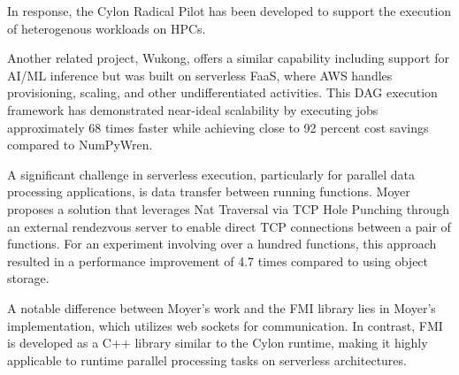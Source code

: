 In response, the Cylon Radical Pilot has been developed to support the execution of heterogenous workloads on HPCs. \cite{sarker2024radical}

Another related project, Wukong, offers a similar capability including support for AI/ML inference but was built on serverless FaaS, where AWS handles provisioning, scaling, and other undifferentiated activities. This DAG execution framework has demonstrated near-ideal scalability by executing jobs approximately 68 times faster while achieving close to 92 percent cost savings compared to NumPyWren. \cite{carver2020wukong}

A significant challenge in serverless execution, particularly for parallel data processing applications, is data transfer between running functions. Moyer proposes a solution that leverages Nat Traversal via TCP Hole Punching through an external rendezvous server to enable direct TCP connections between a pair of functions. For an experiment involving over a hundred functions, this approach resulted in a performance improvement of 4.7 times compared to using object storage. \cite{moyer2021punching}

A notable difference between Moyer’s work and the FMI library lies in Moyer’s implementation, which utilizes web sockets for communication. In contrast, FMI is developed as a C++ library similar to the Cylon runtime, making it highly applicable to runtime parallel processing tasks on serverless architectures. 


